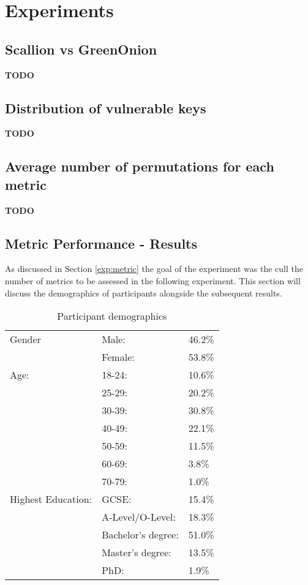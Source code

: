 \chapter{Experiments}
\label{cha:Experiments}

\section{Scallion vs GreenOnion}
\textbf{TODO}

\section{Distribution of vulnerable keys}
\textbf{TODO}

\section{Average number of permutations for each metric}
\textbf{TODO}

\section{Metric Performance - Results}
As discussed in Section \ref{exp:metric} the goal of the experiment was the cull the number of metrics to be assessed in the following experiment. This section will discuss the demographics of participants alongside the subsequent results.

\begin{table}[h!]
    \centering
    \begin{tabular}{|l|ll|}
        \hline
        Gender & Male: & 46.2\% \\
               & Female: & 53.8\% \\
        \hline
        Age:   & 18-24: & 10.6\% \\ 
               & 25-29: & 20.2\% \\ 
               & 30-39: & 30.8\% \\ 
               & 40-49: & 22.1\% \\ 
               & 50-59: & 11.5\% \\ 
               & 60-69: & 3.8\% \\ 
               & 70-79: & 1.0\% \\ 
               
        \hline
        Highest Education:  
        & GCSE:                 & 15.4\%  \\
        & A-Level/O-Level:      & 18.3\% \\
        & Bachelor's degree:    & 51.0\% \\
        & Master's degree:      & 13.5\% \\ 
        & PhD:                  & 1.9\% \\
        \hline

    \end{tabular}
    \caption{Participant demographics}
    \label{tab:exp1_demo}
\end{table}

